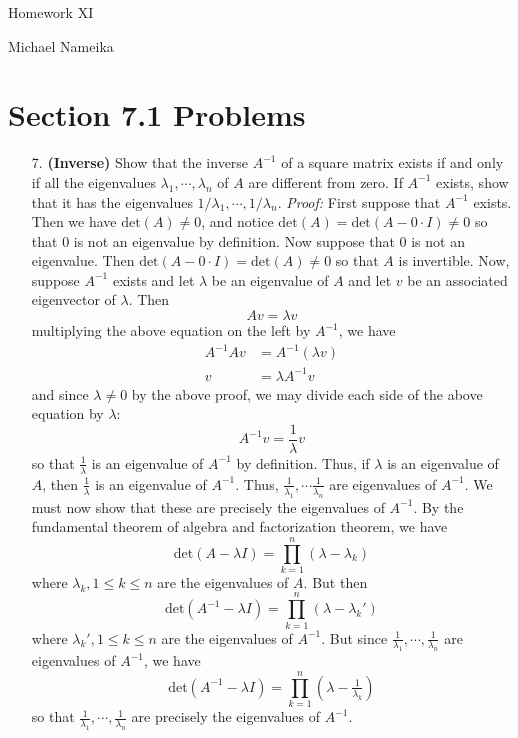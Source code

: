 \documentclass{article}
\begin{document}
\begin{center}
    {\Huge Homework XI}
    \vspace{0.5cm}

    {\Large Michael Nameika}
\end{center}

\section*{Section 7.1 Problems}
\begin{itemize}
    \item[7.] \textbf{(Inverse)} Show that the inverse $A^{-1}$ of a square matrix exists if and only if all the eigenvalues $\lambda_1, \cdots, \lambda_n$ of $A$ are different from zero. If $A^{-1}$ exists, show that it has the eigenvalues $1/\lambda_1, \cdots, 1/\lambda_n$. 
    \newline\newline
    \textit{Proof:} First suppose that $A^{-1}$ exists. Then we have $\text{det}(A) \neq 0$, and notice $\text{det}(A) = \text{det}(A - 0\cdot I) \neq 0$ so that 0 is not an eigenvalue by definition. Now suppose that 0 is not an eigenvalue. Then $\text{det}(A - 0\cdot I) = \text{det}(A) \neq 0$ so that $A$ is invertible. 
    \newline\newline
    Now, suppose $A^{-1}$ exists and let $\lambda$ be an eigenvalue of $A$ and let $v$ be an associated eigenvector of $\lambda$. Then
    \[Av = \lambda v\]
    multiplying the above equation on the left by $A^{-1}$, we have
    \begin{align*}
        A^{-1}Av &= A^{-1}(\lambda v)\\
        v &= \lambda A^{-1}v
    \end{align*}
    and since $\lambda \neq 0$ by the above proof, we may divide each side of the above equation by $\lambda$:
    \[A^{-1}v = \frac{1}{\lambda}v\]
    so that $\tfrac{1}{\lambda}$ is an eigenvalue of $A^{-1}$ by definition. Thus, if $\lambda$ is an eigenvalue of $A$, then $\tfrac{1}{\lambda}$ is an eigenvalue of $A^{-1}$. Thus, $\tfrac{1}{\lambda_1},\cdots \tfrac{1}{\lambda_n}$ are eigenvalues of $A^{-1}$. We must now show that these are precisely the eigenvalues of $A^{-1}$. By the fundamental theorem of algebra and factorization theorem, we have 
    \[\text{det}(A - \lambda I) = \prod_{k = 1}^n(\lambda - \lambda_k)\]
    where $\lambda_k, 1\leq k \leq n$ are the eigenvalues of $A$. But then
    \[\text{det}(A^{-1} - \lambda I) = \prod_{k = 1}^n (\lambda - \lambda_k')\]
    where $\lambda_k', 1\leq k \leq n$ are the eigenvalues of $A^{-1}$. But since $\tfrac{1}{\lambda_1}, \cdots, \tfrac{1}{\lambda_n}$ are eigenvalues of $A^{-1}$, we have
    \[\text{det}(A^{-1} - \lambda I) = \prod_{k = 1}^n (\lambda - \tfrac{1}{\lambda_k})\]
    so that $\tfrac{1}{\lambda_1}, \cdots, \tfrac{1}{\lambda_n}$ are precisely the eigenvalues of $A^{-1}$.


\end{itemize}
\end{document}
